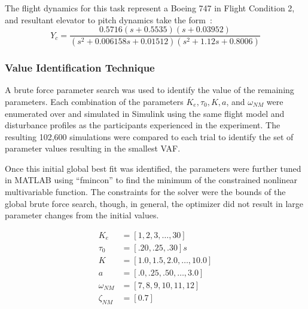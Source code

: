The flight dynamics for this task represent a Boeing 747 in Flight Condition 2, and resultant elevator to pitch dynamics take the form~\citep{heffley1972aircraft}:
\begin{equation}
    Y_c = \frac{0.5716 (s+0.5535) (s+0.03952)}{(s^2 + 0.006158s + 0.01512) (s^2 + 1.12s + 0.8006)}
\end{equation}

\subsubsection{Value Identification Technique}
A brute force parameter search was used to identify the value of the remaining parameters.
Each combination of the parameters $K_e, \tau_0, K, a$, and $\omega_{NM}$ were enumerated over and simulated in Simulink using the same flight model and disturbance profiles as the participants experienced in the experiment.
The resulting 102,600 simulations were compared to each trial to identify the set of parameter values resulting in the smallest VAF.

Once this initial global best fit was identified, the parameters were further tuned in MATLAB using ``fmincon'' to find the minimum of the constrained nonlinear multivariable function.
The constraints for the solver were the bounds of the global brute force search, though, in general, the optimizer did not result in large parameter changes from the initial values.

\begin{align}
    K_e         & = [1, 2, 3, \ldots, 30]         \\
    \tau_0      & = [.20, .25, .30] s             \\
    K           & = [1.0, 1.5, 2.0, \ldots, 10.0] \\
    a           & = [.0, .25, .50, \ldots, 3.0]   \\
    \omega_{NM} & = [7, 8, 9, 10, 11, 12]         \\
    \zeta_{NM}  & = [0.7]                         \\
\end{align}



